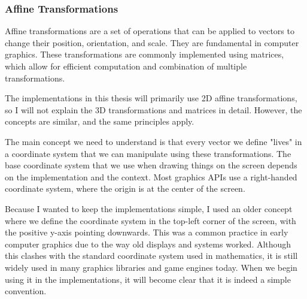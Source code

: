\subsubsection{Affine Transformations}
\label{sec:affine-transformations}

Affine transformations are a set of operations that can be applied to vectors to change their position, orientation, and scale. They are fundamental in computer graphics. These transformations are commonly implemented using matrices, which allow for efficient computation and combination of multiple transformations.

The implementations in this thesis will primarily use 2D affine transformations, so I will not explain the 3D transformations and matrices in detail. However, the concepts are similar, and the same principles apply.

The main concept we need to understand is that every vector we define "lives" in a coordinate system that we can manipulate using these transformations. The base coordinate system that we use when drawing things on the screen depends on the implementation and the context. Most graphics APIs use a right-handed coordinate system, where the origin is at the center of the screen.

Because I wanted to keep the implementations simple, I used an older concept where we define the coordinate system in the top-left corner of the screen, with the positive y-axis pointing downwards. This was a common practice in early computer graphics due to the way old displays and systems worked. Although this clashes with the standard coordinate system used in mathematics, it is still widely used in many graphics libraries and game engines today. When we begin using it in the implementations, it will become clear that it is indeed a simple convention.

